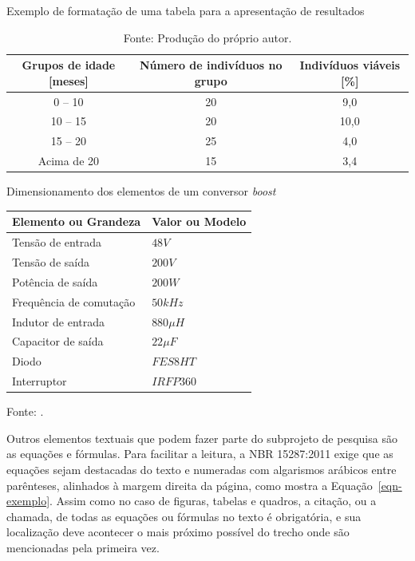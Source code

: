 \documentclass[10pt, a4paper]{article}
\begin{document}
\begin{table}[h]
	\centering
	\caption{Exemplo de formatação de uma tabela para a apresentação de resultados}
	\label{tbl-exemplo}
	\begin{tabular}{ccc}
		\hline
		\textbf{Grupos de idade [meses]} & \textbf{Número de indivíduos no grupo} & \textbf{Indivíduos viáveis [\%]} \\
		\hline
		0 -- 10		& 20	& 9,0
\\
		10 -- 15	& 20	& 10,0
\\
		15 -- 20	& 25	& 4,0
\\
		Acima de 20	& 15	& 3,4
\\
		\hline	
	\end{tabular}
	\caption*{Fonte: Produção do próprio autor.}
\end{table}

\begin{quadro}[h]
	\centering
	\caption{Dimensionamento dos elementos de um conversor \textit{boost}}
	\label{qdr-exemplo}
	\begin{tabular}{|p{60mm}|p{60mm}|}
		\hline
		\rowcolor{gray!25}
		\centering \textbf{Elemento ou Grandeza} &  \centering \textbf{Valor ou Modelo}
		\tabularnewline
		\hline
		Tensão de entrada 		& $48 V$
		\\\hline
		Tensão de saída 		& $200 V$
		\\\hline
		Potência de saída 		& $200 W$
		\\\hline
		Frequência de comutação	& $50 kHz$
		\\\hline
		Indutor de entrada 		& $880 \mu H$
	\\\hline
		Capacitor de saída 		& $22 \mu F$
	\\\hline
		Diodo					& $FES8HT$
		\\\hline
		Interruptor				& $IRFP360$	
	\\\hline
	\end{tabular}
	\caption*{Fonte: \cite{menegaz:thesis2005}.}
\end{quadro}

Outros elementos textuais que podem fazer parte do subprojeto de pesquisa são as equações e fórmulas. Para facilitar a leitura, a NBR 15287:2011 exige que as equações sejam destacadas do texto e numeradas com algarismos arábicos entre parênteses, alinhados à margem direita da página, como mostra a Equação~\eqref{eqn-exemplo}. Assim como no caso de figuras, tabelas e quadros, a citação, ou a chamada, de todas as equações ou fórmulas no texto é obrigatória, e sua localização deve acontecer o mais próximo possível do trecho onde são mencionadas pela primeira vez.
\end{document}
